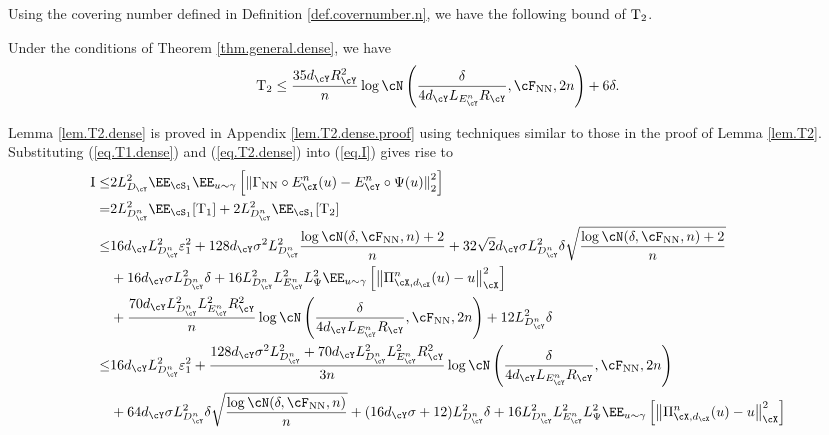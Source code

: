 \documentclass[11pt]{article} %
\begin{document}
Using the covering number defined in Definition \ref{def.covernumber.n}, we have the following bound of ${\rm T_2}$.
\begin{lemma}\label{lem.T2.dense}
	Under the conditions of Theorem \ref{thm.general.dense}, we have
	\begin{align}
		{\rm T_2}\leq \frac{35d_{\cY}R_{\cY}^2}{n}\log \cN\left(\frac{\delta}{4d_{\cY}L_{E^n_{\cY}}R_{\cY}},\cF_{\rm NN},2n\right)+6\delta.
		\label{eq.T2.dense}
	\end{align}
\end{lemma}
Lemma \ref{lem.T2.dense} is proved in Appendix \ref{lem.T2.dense.proof} using techniques similar to those in the proof of Lemma \ref{lem.T2}.
Substituting (\ref{eq.T1.dense}) and (\ref{eq.T2.dense}) into (\ref{eq.I}) gives rise to
\begin{align}
	{\rm I}\leq&2L_{D_{\cY}}^2\EE_{\cS_1}\EE_{u\sim \gamma}\left[ \left\| \Gamma_{\rm NN} \circ E_{\cX}^n(u)- E_{\cY}^n\circ\Psi(u)\right\|_{2}^2 \right]\nonumber\\
	=&2L_{D^n_{\cY}}^2\EE_{\cS_1} [{\rm T_1}] + 2L_{D^n_{\cY}}^2\EE_{\cS_1}[ {\rm T_2}] \nonumber\\
	\leq& 16d_{\cY}L_{D^n_{\cY}}^2\varepsilon_1^2+128d_{\cY}\sigma^2L_{D^n_{\cY}}^2\frac{\log \cN(\delta,\cF_{\rm NN}, n) +2}{n} + 32\sqrt{2}d_{\cY}\sigma L_{D^n_{\cY}}^2\delta \sqrt{\frac{\log \cN(\delta,\cF_{\rm NN}, n) +2}{n}}\nonumber\\
	& +16d_{\cY}\sigma L_{D^n_{\cY}}^2\delta +16L_{D^n_{\cY}}^2L_{E^n_{\cY}}^2L_{\Psi}^2\EE_{u\sim \gamma}\left[ \left\| \Pi_{\cX,d_{\cX}}^n(u)- u\right\|_{\cX}^2\right]\\
	& +\frac{70d_{\cY}L_{D^n_{\cY}}^2L_{E^n_{\cY}}^2R_{\cY}^2}{n}\log \cN\left(\frac{\delta}{4d_{\cY}L_{E^n_{\cY}}R_{\cY}},\cF_{\rm NN},2n\right)+12L_{D^n_{\cY}}^2\delta\nonumber \\
	\leq& 16d_{\cY}L_{D^n_{\cY}}^2\varepsilon_1^2+\frac{128d_{\cY}\sigma^2L_{D^n_{\cY}}^2+70d_{\cY}L_{D^n_{\cY}}^2L_{E^n_{\cY}}^2R_{\cY}^2}{3n}\log \cN\left(\frac{\delta}{4d_{\cY}L_{E^n_{\cY}}R_{\cY}},\cF_{\rm NN}, 2n\right)  \nonumber\\
	& + 64d_{\cY}\sigma L_{D^n_{\cY}}^2\delta \sqrt{\frac{\log \cN(\delta,\cF_{\rm NN}, n) }{n}}+(16d_{\cY}\sigma+12) L_{D^n_{\cY}}^2 \delta +16L_{D^n_{\cY}}^2 L_{E^n_{\cY}}^2L_{\Psi}^2\EE_{u\sim \gamma}\left[ \left\| \Pi_{\cX,d_{\cX}}^n(u)- u\right\|_{\cX}^2\right]
	\label{eq.I.dense}
\end{align}
\end{document}
